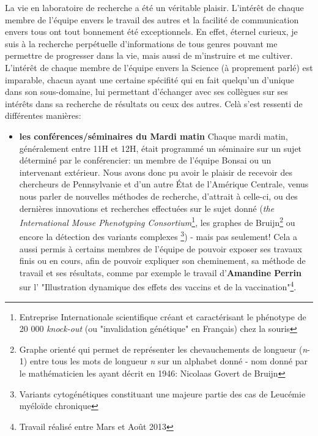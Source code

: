 \documentclass[12pt]{report}
\begin{document}
\begin{spacing}{1.2}
La vie en laboratoire de recherche a été un véritable plaisir.
\newline
L'intérêt de chaque membre de l'équipe envers le travail des autres et la facilité de communication envers tous ont tout bonnement été exceptionnels. En effet, éternel curieux, je suis à la recherche perpétuelle d'informations de tous genres pouvant me permettre de progresser dans la vie, mais aussi de m'instruire et me cultiver. L'intérêt de chaque membre de l'équipe envers la Science (à proprement parlé) est imparable, chacun ayant une certaine spécifité qui en fait quelqu'un d'unique dans son sous-domaine, lui permettant d'échanger avec ses collègues sur ses intérêts dans sa recherche de résultats ou ceux des autres.
\newline
Celà s'est ressenti de différentes manières:
\begin{itemize}
\item \textbf{les conférences/séminaires du Mardi matin}
	\newline
	Chaque mardi matin, généralement entre 11H et 12H, était programmé un séminaire sur un sujet déterminé par le conférencier: un membre de l'équipe Bonsai ou un intervenant extérieur.
	\newline
	Nous avons donc pu avoir le plaisir de recevoir des chercheurs de Pennsylvanie et d'un autre État de l'Amérique Centrale, venus nous parler de nouvelles méthodes de recherche, d'attrait à celle-ci, ou des dernières innovations et recherches effectuées sur le sujet donné (\textit{the International Mouse Phenotyping Consortium}\footnote{Entreprise Internationale scientifique créant et caractérisant le phénotype de 20 000 \textit{knock-out} (ou "invalidation génétique" en Français) chez la souris}, les graphes de Bruijn\footnote{Graphe orienté qui permet de représenter les chevauchements de longueur (\textit{n}-1) entre tous les mots de longueur \textit{n} sur un alphabet donné - nom donné par le mathématicien les ayant décrit en 1946: Nicolaas Govert de Bruijn} ou encore la détection des variants complexes \footnote{Variants cytogénétiques constituant une majeure partie des cas de Leucémie myéloïde chronique}) -  mais pas seulement!
	\newline
	Cela a aussi permis à certains membres de l'équipe de pouvoir exposer ses travaux finis ou en cours, afin de pouvoir expliquer son cheminement, sa méthode de travail et ses résultats, comme par exemple le travail d'\textbf{Amandine Perrin} sur l' "Illustration dynamique des effets des vaccins et de la vaccination"\footnote{Travail réalisé entre Mars et Août 2013}.

\end{itemize}
\end{spacing}
\end{document}
